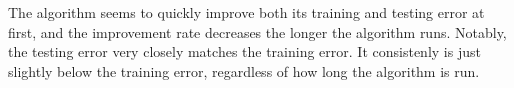 \documentclass{article}
\begin{document}
\begin{figure}[H]
	\centering
\end{figure}
\begin{figure}[H]
	\centering
\end{figure}
The algorithm seems to quickly improve both its training and testing error at first, and the improvement rate decreases the longer the algorithm runs. Notably, the testing error very closely matches the training error. It consistenly is just slightly below the training error, regardless of how long the algorithm is run.
\end{document}
